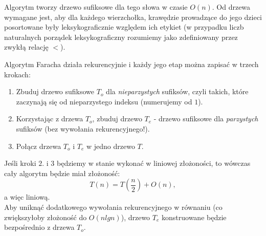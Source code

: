     Algorytm tworzy drzewo sufiksowe dla tego słowa w czasie $O(n)$. Od drzewa wymagane jest, aby dla każdego wierzchołka, krawędzie prowadzące do jego dzieci posortowane były leksykograficznie względem ich etykiet (w przypadku liczb naturalnych porządek leksykograficzny rozumiemy jako zdefiniowany przez zwykłą relację $<$).
    
    Algorytm Faracha działa rekurencyjnie i każdy jego etap można zapisać w trzech krokach:
    \begin{enumerate}
     \item Zbuduj drzewo sufiksowe $T_o$ dla \textit{nieparzystych} sufiksów, czyli takich, które zaczynają się od nieparzystego indeksu (numerujemy od $1$).
     \item Korzystając z drzewa $T_o$, zbuduj drzewo $T_e$ - drzewo sufiksowe dla \textit{parzystych} sufiksów (bez wywołania rekurencyjnego!).
     \item Połącz drzewa $T_o$ i $T_e$ w jedno drzewo $T$.
    \end{enumerate}
    Jeśli kroki $2.$ i $3$ będziemy w stanie wykonać w liniowej złożoności, to wówczas cały algorytm będzie miał złożoność:
    $$
        T(n) = T\left(\frac{n}{2}\right) + O(n),
    $$
    a więc liniową. \\
    Aby  uniknąć dodatkowego wywołania rekurencyjnego w równaniu (co zwiększyłoby złożoność do $O(nlgn)$), drzewo $T_e$ konstruowane będzie bezpośrednio z drzewa $T_o$.
    
